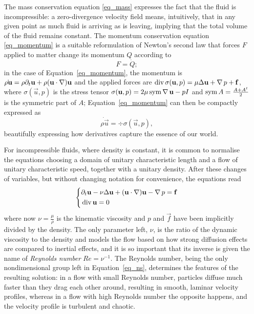 The mass conservation equation \eqref{eq_mass} expresses the fact that
the fluid is incompressible: a zero-divergence velocity field means,
intuitively, that in any given point as much fluid is arriving as is
leaving, implying that the total volume of the fluid remains constant.
The momentum conservation equation \eqref{eq_momentum} is a suitable
reformulation of Newton's second law that forces \(F\) applied to matter change
its momentum \(Q\) according to
\begin{equation}
  F = \dot Q;
  \label{eq_newtonSecondLaw}
\end{equation}
in the case of Equation~\eqref{eq_momentum}, the momentum is \(\dot
{\rho \mathbf{u}} = \rho \partial_{t} \mathbf{u} + \rho (\mathbf{u} \cdot \operatorname{\nabla})
\mathbf{u}\) and the applied forces are \(\operatorname{div} \sigma(\mathbf{u}, p) = \mu
\Delta \mathbf{u} + \operatorname{\nabla} p + \mathbf{f}\), where \(\sigma(\vec{u}, p)\) is the
stress tensor \(\sigma(\mathbf{u}, p) = 2 \mu \operatorname{sym}\operatorname{\nabla} \mathbf{u} - pI\) and \(\operatorname{sym} A = \frac{A + A^t}{2}\) is the symmetric part of \(A\);
Equation~\eqref{eq_momentum} can then be compactly expressed as
\begin{equation}
  \dot {\rho \vec{u}} = \div \sigma(\vec{u}, p),
  \label{eq_momentumDerivatives}
\end{equation}
beautifully expressing how derivatives capture the essence of our world.

For incompressible fluids, where density is constant, it is common to
normalise the equations choosing a domain of unitary characteristic
length and a flow of unitary characteristic speed, together with a
unitary density.
After these changes of variables, but without changing notation for
convenience, the equations read
\begin{equation}
  \left\{
    \begin{aligned}
      &\partial_{t} \mathbf{u} - \nu \Delta \mathbf{u} + (\mathbf{u} \cdot \operatorname{\nabla})
        \mathbf{u} - \operatorname{\nabla} p = \mathbf{f} \\
      &\operatorname{div} \mathbf{u} = 0
    \end{aligned}
  \right.
  \label{eq_ns}
\end{equation}
where now \(\nu = \frac{\mu}{\rho}\) is the kinematic viscosity and \(p\)
and \(\vec{f}\) have been implicitly divided by the density.
The only parameter left, \(\nu\), is the ratio of the dynamic viscosity
to the density and models the flow based on how strong diffusion effects
are compared to inertial effects, and it is so important that its inverse
is given the name of \emph{Reynolds number} \(Re = \nu^{-1}\).
The Reynolds number, being the only nondimensional group left in
Equation~\eqref{eq_ns}, determines the features of the resulting
solution: in a flow with small Reynolds number, particles diffuse much
faster than they drag each other around, resulting in smooth, laminar
velocity profiles, whereas in a flow with high Reynolds number the
opposite happens, and the velocity profile is turbulent and chaotic.

